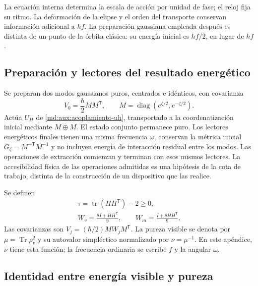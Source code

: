 La ecuación interna determina la escala de acción por unidad
de fase; el reloj fija su ritmo. La deformación de la elipse
y el orden del transporte conservan información adicional a
$hf$. La preparación gaussiana empleada después es distinta
de un punto de la órbita clásica: su energía inicial es
$hf/2$, en lugar de $hf$.

\subsection{Preparación y lectores del resultado energético}
\label{md:aux:hipotesis-gaussianas}

Se preparan dos modos gaussianos puros, centrados e idénticos,
con covarianza
\begin{equation}
 V_0=\frac\hbar2MM^{\mathsf T},\qquad
 M=\operatorname{diag}(e^{\zeta/2},e^{-\zeta/2}).
 \label{md:aux:preparacion}
\end{equation}
Actúa $U_H$ de \eqref{md:aux:acoplamiento-uh}, transportado a
la coordenatización inicial mediante $M\oplus M$. El estado conjunto
permanece puro. Los lectores energéticos finales tienen una
misma frecuencia $\omega$, conservan la métrica inicial
$G_\zeta=M^{-\mathsf T}M^{-1}$ y no incluyen energía de
interacción residual entre los modos. Las operaciones de
extracción comienzan y terminan con esos mismos lectores.
La accesibilidad física de las operaciones admitidas es una
hipótesis de la cota de trabajo, distinta de la construcción
de un dispositivo que las realice.

Se definen
\begin{equation}
 \begin{gathered}
 \tau=\operatorname{tr}(HH^{\mathsf T})-2\geq0,\\
 W_v=\frac{8I+HH^{\mathsf T}}9,\qquad
 W_m=\frac{I+8HH^{\mathsf T}}9.
 \end{gathered}
 \label{md:aux:covarianzas-reducidas}
\end{equation}
Las covarianzas son $V_j=(\hbar/2)MW_jM^{\mathsf T}$.
La pureza visible se denota por $\mu=\operatorname{Tr}\rho_v^2$
y su autovalor simpléctico normalizado por $\nu=\mu^{-1}$.
En este apéndice, $\nu$ tiene esta función; la frecuencia
ordinaria se escribe $f$ y la angular $\omega$.

\subsection{Identidad entre energía visible y pureza}
\label{md:aux:energia-pureza}

